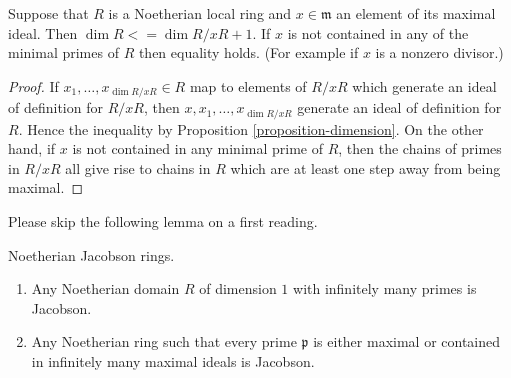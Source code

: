 \begin{lemma}
\label{lemma-one-equation}
Suppose that $R$ is a Noetherian local ring and $x\in \mathfrak m$ an
element of its maximal ideal. Then $\dim R <= \dim R/xR + 1$.
If $x$ is not contained in any of the minimal primes of $R$
then equality holds. (For example if $x$ is a nonzero divisor.)
\end{lemma}

\begin{proof}
If $x_1, \ldots, x_{\dim R/xR} \in R$ map to elements of $R/xR$ which
generate an ideal of definition for $R/xR$, then $x, x_1, \ldots,
x_{\dim R/xR}$ generate an ideal of definition for $R$. Hence
the inequality by Proposition \ref{proposition-dimension}.
On the other hand, if $x$ is not contained in any minimal
prime of $R$, then the chains of primes in $R/xR$ all give
rise to chains in $R$ which are at least one step away
from being maximal.
\end{proof}

\noindent
Please skip the following lemma on a first reading.

\begin{lemma}
\label{lemma-noetherian-dim-1-Jacobson}
Noetherian Jacobson rings.
\begin{enumerate}
\item Any Noetherian domain $R$ of dimension $1$
with infinitely many primes is Jacobson.
\item Any Noetherian ring such that every prime
$\mathfrak p$ is either maximal or contained in
infinitely many maximal ideals is Jacobson.
\end{enumerate}
\end{lemma}

